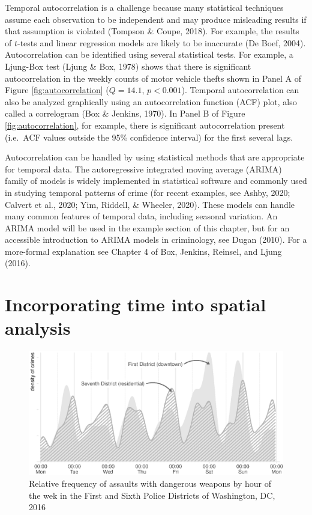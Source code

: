 \documentclass[
  english,
  man,a4paper,mask,floatsintext]{apa6}
\begin{document}
Temporal autocorrelation is a challenge because many statistical techniques assume each observation to be independent and may produce misleading results if that assumption is violated (Tompson \& Coupe, 2018). For example, the results of \(t\)-tests and linear regression models are likely to be inaccurate (De Boef, 2004). Autocorrelation can be identified using several statistical tests. For example, a Ljung-Box test (Ljung \& Box, 1978) shows that there is significant autocorrelation in the weekly counts of motor vehicle thefts shown in Panel A of Figure \ref{fig:autocorrelation} (\(Q = 14.1\), \(p<0.001\)). Temporal autocorrelation can also be analyzed graphically using an autocorrelation function (ACF) plot, also called a correlogram (Box \& Jenkins, 1970). In Panel B of Figure \ref{fig:autocorrelation}, for example, there is significant autocorrelation present (i.e.~ACF values outside the 95\% confidence interval) for the first several lags.

Autocorrelation can be handled by using statistical methods that are appropriate for temporal data. The autoregressive integrated moving average (ARIMA) family of models is widely implemented in statistical software and commonly used in studying temporal patterns of crime (for recent examples, see Ashby, 2020; Calvert et al., 2020; Yim, Riddell, \& Wheeler, 2020). These models can handle many common features of temporal data, including seasonal variation. An ARIMA model will be used in the example section of this chapter, but for an accessible introduction to ARIMA models in criminology, see Dugan (2010). For a more-formal explanation see Chapter 4 of Box, Jenkins, Reinsel, and Ljung (2016).

\hypertarget{incorporating-time-into-spatial-analysis}{%
\section{Incorporating time into spatial analysis}\label{incorporating-time-into-spatial-analysis}}

\begin{figure}
\centering
\includegraphics{figure_14-5.eps}
\caption{\label{fig:districts}Relative frequency of assaults with dangerous weapons by hour of the wek in the First and Sixth Police Districts of Washington, DC, 2016}
\end{figure}
\end{document}
